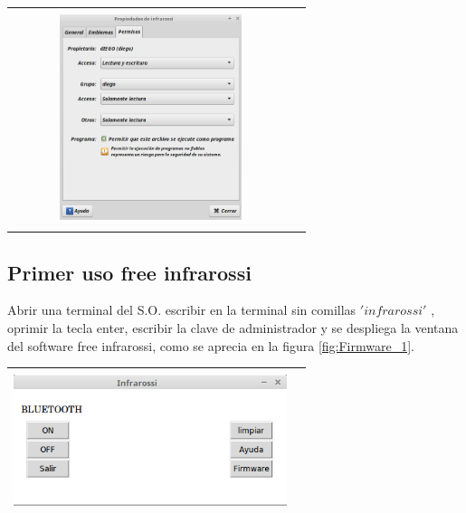 \documentclass[12]{article}
\newenvironment{Figure}
{\par\medskip\noindent\minipage{\linewidth}}
{\endminipage\par\medskip}
\begin{document}
\begin{multicols}{2}
\begin{Figure}
\begin{tabular}{|l|r|}
\end{tabular}
\label{fig:propiedades1}
\end{Figure}
\begin{Figure}	
\center
\begin{tabular}{|l|r|}
\hline
\\
\includegraphics[width=8cm, height=6cm]{img/S_propiedades2.png} \\\\ \hline
\end{tabular}
\label{fig:propiedades2}
\end{Figure}
\subsection{Primer uso free infrarossi}
Abrir una terminal del S.O. escribir en la terminal sin comillas $'infrarossi'$ , oprimir la tecla enter, escribir la clave de administrador y se despliega la ventana del software free infrarossi, como se aprecia en la figura \ref{fig:Firmware_1}.
\begin{Figure}	
\center
\begin{tabular}{|l|r|}
\hline
\includegraphics[width=8cm, height=4cm]{img/infrarossi.png} \\ \hline
\end{tabular}
\label{fig:Firmware_1}
\end{Figure}

\end{multicols}
\end{document}
